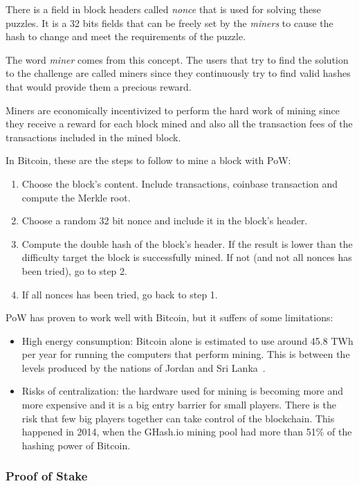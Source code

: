 There is a field in block headers called \textit{nonce} that is used for solving these puzzles. It is a 32 bits fields that can be freely set by the \textit{miners} to cause the hash to change and meet the requirements of the puzzle.

The word \textit{miner} comes from this concept. The users that try to find the solution to the challenge are called miners since they continuously try to find valid hashes that would provide them a precious reward. 

Miners are economically incentivized to perform the hard work of mining since they receive a reward for each block mined and also all the transaction fees of the transactions included in the mined block.

In Bitcoin, these are the steps to follow to mine a block with PoW:

\begin{enumerate}
    \item Choose the block's content. Include transactions, coinbase transaction and compute the Merkle root.
    \item Choose a random 32 bit nonce and include it in the block's header.
    \item Compute the double hash of the block's header. If the result is lower than the difficulty target the block is successfully mined. If not (and not all nonces has been tried), go to step 2.
    \item If all nonces has been tried, go back to step 1. 
\end{enumerate}

PoW has proven to work well with Bitcoin, but it suffers of some limitations:

\begin{itemize}
    \item High energy consumption: Bitcoin alone is estimated to use around 45.8 TWh per year for running the computers that perform mining. This is between the levels produced by the nations of Jordan and Sri Lanka~\cite{bitcoin-footprint}.
    \item Risks of centralization: the hardware used for mining is becoming more and more expensive and it is a big entry barrier for small players. There is the risk that few big players together can take control of the blockchain. This happened in 2014, when the GHash.io mining pool had more than 51\% of the hashing power of Bitcoin.
\end{itemize}

\subsubsection{Proof of Stake}

